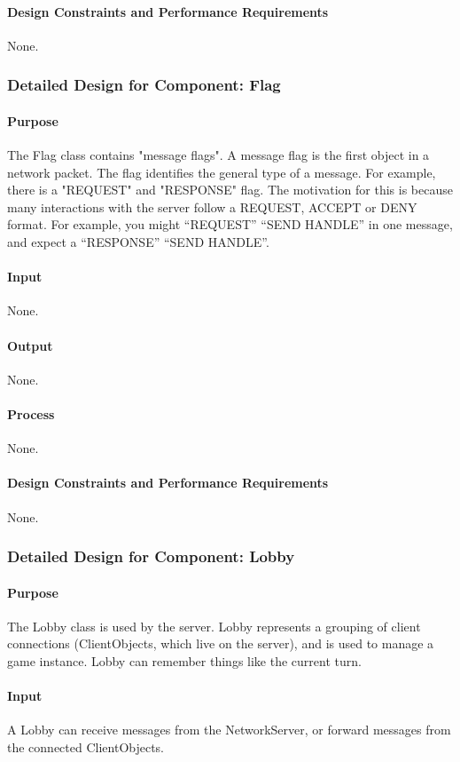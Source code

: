 \documentclass[12pt,a4paper,titlepage]{article}
\begin{document}
\paragraph{Design Constraints and Performance Requirements} None.

\subsubsection{Detailed Design for Component: Flag }
\paragraph{Purpose} The Flag class contains "message flags". A message flag is the first object in a network packet. The flag identifies the general type of a message. For example, there is a "REQUEST" and "RESPONSE" flag. The motivation for this is because many interactions with the server follow a REQUEST, ACCEPT or DENY format. For example, you might ``REQUEST'' ``SEND HANDLE'' in one message, and expect a ``RESPONSE'' ``SEND HANDLE''.
\paragraph{Input} None.
\paragraph{Output} None.
\paragraph{Process} None.
\paragraph{Design Constraints and Performance Requirements} None.
	
\subsubsection{Detailed Design for Component: Lobby }
\paragraph{Purpose} The Lobby class is used by the server. Lobby represents a grouping of client connections (ClientObjects, which live on the server), and is used to manage a game instance. Lobby can remember things like the current turn. 
\paragraph{Input} A Lobby can receive messages from the NetworkServer, or forward messages from the connected ClientObjects. 
\end{document}

